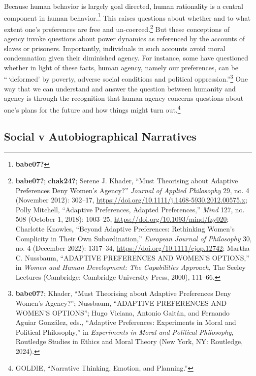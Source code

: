 \documentclass[
  12pt,
]{book}
\theoremstyle{definition}
\theoremstyle{definition}
\theoremstyle{definition}
\theoremstyle{definition}
\theoremstyle{remark}
\begin{document}
Because human behavior is largely goal directed, human rationality is a central component in human behavior.\footnote{\textbf{babe07?}} This raises questions about whether and to what extent one's preferences are free and un-coerced.\footnote{\textbf{babe07?}; \textbf{chak24?}; Serene J. Khader, {``Must {Theorising} about {Adaptive Preferences Deny Women}'s {Agency}?''} \emph{Journal of Applied Philosophy} 29, no. 4 (November 2012): 302--17, \url{https://doi.org/10.1111/j.1468-5930.2012.00575.x}; Polly Mitchell, {``Adaptive {Preferences}, {Adapted Preferences},''} \emph{Mind} 127, no. 508 (October 1, 2018): 1003--25, \url{https://doi.org/10.1093/mind/fzy020}; Charlotte Knowles, {``Beyond Adaptive Preferences: {Rethinking} Women's Complicity in Their Own Subordination,''} \emph{European Journal of Philosophy} 30, no. 4 (December 2022): 1317--34, \url{https://doi.org/10.1111/ejop.12742}; Martha C. Nussbaum, {``{ADAPTIVE PREFERENCES AND WOMEN}'{S OPTIONS},''} in \emph{Women and Human Development: {The} Capabilities Approach}, The Seeley Lectures (Cambridge: Cambridge University Press, 2000), 111--66.} But these conceptions of agency invoke questions about power dynamics as referenced by the accounts of slaves or prisoners. Importantly, individuals in such accounts avoid moral condemnation given their diminished agency. For instance, some have questioned whether in light of these facts, human agency, namely our preferences, can be ``\,`deformed' by poverty, adverse social conditions and political oppression.''\footnote{\textbf{babe07?}; Khader, {``Must {Theorising} about {Adaptive Preferences Deny Women}'s {Agency}?''}; Nussbaum, {``{ADAPTIVE PREFERENCES AND WOMEN}'{S OPTIONS}''}; Hugo Viciana, Antonio Gaitán, and Fernando Aguiar González, eds., {``Adaptive {Preferences}: {Experiments} in {Moral} and {Political Philosophy},''} in \emph{Experiments in Moral and Political Philosophy}, Routledge Studies in Ethics and Moral Theory (New York, NY: Routledge, 2024).} One way that we can understand and answer the question between humanity and agency is through the recognition that human agency concerns questions about one's plans for the future and how things might turn out.\footnote{GOLDIE, {``Narrative {Thinking}, {Emotion}, and {Planning}.''}}

\subsection*{Social v Autobiographical Narratives}\label{social-v-autobiographical-narratives}
\end{document}

